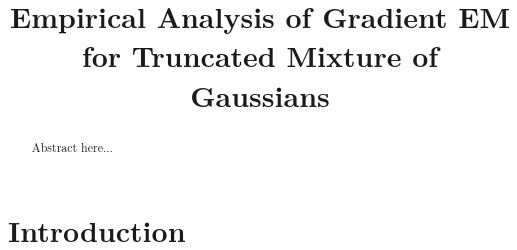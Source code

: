 \documentclass[11pt, twoside, letter]{article}
\numberwithin{equation}{section}
\begin{document}
\title{Empirical Analysis of Gradient EM for Truncated Mixture of Gaussians}






\date{}
\maketitle

\begin{abstract}
	Abstract here...
\end{abstract}

\section{Introduction}



%

%
%
%
%
\end{document}
